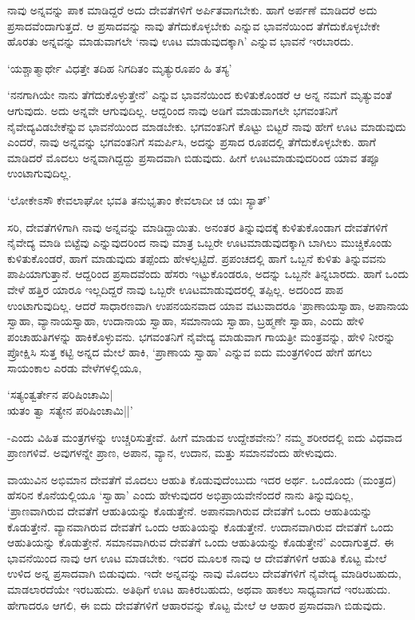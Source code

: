 ನಾವು ಅನ್ನವನ್ನು ಪಾಕ ಮಾಡಿದ್ದರೆ ಅದು ದೇವತೆಗಳಿಗೆ ಅರ್ಪಿತವಾಗಬೇಕು. ಹಾಗೆ ಅರ್ಪಣೆ ಮಾಡಿದರೆ ಅದು ಪ್ರಸಾದವೆಂದಾಗುತ್ತದೆ. ಆ ಪ್ರಸಾದವನ್ನು ನಾವು ತೆಗೆದುಕೊಳ್ಳಬೇಕು ಎನ್ನುವ ಭಾವನೆಯಿಂದ ತೆಗೆದುಕೊಳ್ಳಬೇಕೇ ಹೊರತು ಅನ್ನವನ್ನು ಮಾಡುವಾಗಲೇ `ನಾವು ಊಟ ಮಾಡುವುದಕ್ಕಾಗಿ' ಎನ್ನುವ ಭಾವನೆ ಇರಬಾರದು.

\begin{shloka}
`ಯಶ್ಚಾತ್ಮಾರ್ಥೇ ವಿಧತ್ತೇ ತದಿಹ ನಿಗದಿತಂ ಮೃತ್ಯುರೂಪಂ ಹಿ ತಸ್ಯ'
\end{shloka}

`ನನಗಾಗಿಯೇ ನಾನು ತೆಗೆದುಕೊಳ್ಳುತ್ತೇನೆ' ಎನ್ನುವ ಭಾವನೆಯಿಂದ ಕುಳಿತುಕೊಂಡರೆ ಆ ಅನ್ನ ನಮಗೆ ಮೃತ್ಯುವಂತೆ ಆಗುವುದು. ಅದು ಅನ್ನವೇ ಆಗುವುದಿಲ್ಲ. ಆದ್ದರಿಂದ ನಾವು ಅಡಿಗೆ ಮಾಡುವಾಗಲೇ ಭಗವಂತನಿಗೆ ನೈವೇದ್ಯವಿಡಬೇಕೆನ್ನುವ ಭಾವನೆಯಿಂದ ಮಾಡಬೇಕು. ಭಗವಂತನಿಗೆ ಕೊಟ್ಟು ಬಿಟ್ಟರೆ ನಾವು ಹೇಗೆ ಊಟ ಮಾಡುವುದು ಎಂದರೆ, ನಾವು ಅನ್ನವನ್ನು ಭಗವಂತನಿಗೆ ಸಮರ್ಪಿಸಿ, ಅದನ್ನು  ಪ್ರಸಾದ ರೂಪದಲ್ಲಿ ತೆಗೆದುಕೊಳ್ಳಬೇಕು. ಹಾಗೆ ಮಾಡಿದರೆ ಮೊದಲು ಅನ್ನವಾಗಿದ್ದದ್ದು  ಪ್ರಸಾದವಾಗಿ ಬಿಡುವುದು. ಹೀಗೆ ಊಟಮಾಡುವುದರಿಂದ ಯಾವ ತಪ್ಪೂ ಉಂಟಾಗುವುದಿಲ್ಲ.

\begin{shloka}
`ಲೋಕೇಽಸೌ ಕೇವಲಾಘೋ ಭವತಿ ತನುಭೃತಾಂ ಕೇವಲಾದೀ ಚ ಯಃ ಸ್ಯಾತ್'
\end{shloka}

ಸರಿ, ದೇವತೆಗಳಿಗಾಗಿ ನಾವು ಅನ್ನವನ್ನು ಮಾಡಿದ್ದಾಯಿತು. ಅನಂತರ ತಿನ್ನುವುದಕ್ಕೆ ಕುಳಿತುಕೊಂಡಾಗ ದೇವತೆಗಳಿಗೆ ನೈವೇದ್ಯ ಮಾಡಿ ಬಿಟ್ಟೆವು ಎನ್ನುವುದರಿಂದ ನಾವು ಮಾತ್ರ ಒಬ್ಬರೇ ಊಟಮಾಡುವುದಕ್ಕಾಗಿ ಬಾಗಿಲು ಮುಚ್ಚಿಕೊಂಡು ಕುಳಿತುಕೊಂಡರೆ, ಹಾಗೆ ಮಾಡುವುದು ತಪ್ಪೆಂದು ಹೇಳಲ್ಪಟ್ಟಿದೆ. ಪ್ರಪಂಚದಲ್ಲಿ ಹಾಗೆ ಒಬ್ಬನೆ ಕುಳಿತು ತಿನ್ನುವವನು ಪಾಪಿಯಾಗುತ್ತಾನೆ. ಆದ್ದರಿಂದ ಪ್ರಸಾದವೆಂದು ಹೆಸರು ಇಟ್ಟುಕೊಂಡರೂ, ಅದನ್ನು ಒಬ್ಬನೇ ತಿನ್ನಬಾರದು. ಹಾಗೆ ಒಂದು ವೇಳೆ ಹತ್ತಿರ ಯಾರೂ ಇಲ್ಲದಿದ್ದರೆ ನಾವು ಒಬ್ಬರೇ ಊಟಮಾಡುವುದರಲ್ಲಿ ತಪ್ಪಿಲ್ಲ. ಅದರಿಂದ ಪಾಪ ಉಂಟಾಗುವುದಿಲ್ಲ. ಆದರೆ ಸಾಧಾರಣವಾಗಿ ಉಪನಯನವಾದ ಯಾವ ವಟುವಾದರೂ `ಪ್ರಾಣಾಯಸ್ವಾಹಾ, ಅಪಾನಾಯ ಸ್ವಾಹಾ, ವ್ಯಾನಾಯಸ್ವಾಹಾ, ಉದಾನಾಯ ಸ್ವಾಹಾ, ಸಮಾನಾಯ ಸ್ವಾಹಾ, ಬ್ರಹ್ಮಣೇ ಸ್ವಾಹಾ, ಎಂದು ಹೇಳಿ ಪಂಚಾಹುತಿಗಳನ್ನು ಹಾಕಿಕೊಳ್ಳುವನು. ಭಗವಂತನಿಗೆ ನೈವೇದ್ಯ ಮಾಡುವಾಗ ಗಾಯತ್ರೀ ಮಂತ್ರವನ್ನು, ಹೇಳಿ ನೀರನ್ನು ಪ್ರೋಕ್ಷಿಸಿ ಸುತ್ತ ಕಟ್ಟಿ ಅನ್ನದ ಮೇಲೆ ಹಾಕಿ, `ಪ್ರಾಣಾಯ ಸ್ವಾಹಾ' ಎನ್ನುವ ಐದು ಮಂತ್ರಗಳಿಂದ ಹೇಗೆ ಹಗಲು ಸಾಯಂಕಾಲ ಎರಡು ವೇಳೆಗಳಲ್ಲಿಯೂ,

\begin{shloka}
`ಸತ್ಯಂತ್ವರ್ತೇನ ಪರಿಷಿಂಚಾಮಿ|\\
ಋತಂ ತ್ವಾ ಸತ್ಯೇನ ಪರಿಷಿಂಚಾಮಿ||'
\end{shloka}

-ಎಂದು ವಿಹಿತ ಮಂತ್ರಗಳನ್ನು ಉಚ್ಚರಿಸುತ್ತೇವೆ. ಹೀಗೆ ಮಾಡುವ ಉದ್ದೇಶವೇನು? ನಮ್ಮ ಶರೀರದಲ್ಲಿ ಐದು ವಿಧವಾದ ಪ್ರಾಣಗಳಿವೆ. ಅವುಗಳನ್ನೇ ಪ್ರಾಣ, ಅಪಾನ, ವ್ಯಾನ, ಉದಾನ, ಮತ್ತು ಸಮಾನವೆಂದು ಹೇಳುವುದು.

ವಾಯುವಿನ ಅಭಿಮಾನ ದೇವತೆಗೆ ಮೊದಲು ಆಹುತಿ ಕೊಡುವುದೆಂಬುದು ಇದರ ಅರ್ಥ. ಒಂದೊಂದು (ಮಂತ್ರದ) ಹೆಸರಿನ ಕೊನೆಯಲ್ಲಿಯೂ `ಸ್ವಾಹಾ' ಎಂದು ಹೇಳುವುದರ ಅಭಿಪ್ರಾಯವೇನೆಂದರೆ ನಾನು ತಿನ್ನುವುದಿಲ್ಲ, `ಪ್ರಾಣವಾಗಿರುವ ದೇವತೆಗೆ ಆಹುತಿಯನ್ನು ಕೊಡುತ್ತೇನೆ. ಅಪಾನವಾಗಿರುವ ದೇವತೆಗೆ ಒಂದು ಆಹುತಿಯನ್ನು ಕೊಡುತ್ತೇನೆ. ವ್ಯಾನವಾಗಿರುವ ದೇವತೆಗೆ ಒಂದು ಆಹುತಿಯನ್ನು ಕೊಡುತ್ತೇನೆ. ಉದಾನವಾಗಿರುವ ದೇವತೆಗೆ ಒಂದು ಆಹುತಿಯನ್ನು ಕೊಡುತ್ತೇನೆ. ಸಮಾನವಾಗಿರುವ ದೇವತೆಗೆ ಒಂದು ಆಹುತಿಯನ್ನು ಕೊಡುತ್ತೇನೆ' ಎಂದಾಗುತ್ತದೆ. ಈ ಭಾವನೆಯಿಂದ ನಾವು ಆಗ ಊಟ ಮಾಡಬೇಕು. ಇದರ ಮೂಲಕ ನಾವು ಆ ದೇವತೆಗಳಿಗೆ ಆಹುತಿ ಕೊಟ್ಟ ಮೇಲೆ ಉಳಿದ ಅನ್ನ ಪ್ರಸಾದವಾಗಿ ಬಿಡುವುದು. ಇದೇ ಅನ್ನವನ್ನು ನಾವು ಮೊದಲು ದೇವತೆಗಳಿಗೆ ನೈವೇದ್ಯ ಮಾಡಿರಬಹುದು, ಮಾಡಲಾರದೆಯೇ ಇರಬಹುದು. ಅತಿಥಿಗೆ ಊಟ ಹಾಕಿರಬಹುದು, ಅಥವಾ ಹಾಕಲು ಸಾಧ್ಯವಾಗದೆ ಇರಬಹುದು. ಹೇಗಾದರೂ ಆಗಲಿ, ಈ ಐದು ದೇವತೆಗಳಿಗೆ ಆಹಾರವನ್ನು ಕೊಟ್ಟ ಮೇಲೆ ಆ ಆಹಾರ ಪ್ರಸಾದವಾಗಿ ಬಿಡುವುದು.

